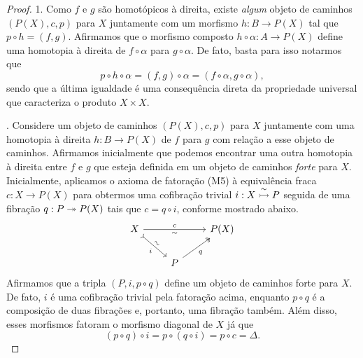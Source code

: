 \begin{proof}
  1. Como $f$ e $g$ são homotópicos à direita, existe \emph{algum} objeto de caminhos $(P(X),c,p)$ para $X$ juntamente com um morfismo $h: B \to P(X)$ tal que $p \circ h = (f,g)$.
  Afirmamos que o morfismo composto $h \circ \alpha: A \to P(X)$ define uma homotopia à direita de $f \circ \alpha$ para $g \circ \alpha$.
  De fato, basta para isso notarmos que
  \begin{displaymath}
    p \circ h \circ \alpha = (f,g) \circ \alpha = (f \circ \alpha, g \circ \alpha),
  \end{displaymath}
  sendo que a última igualdade é uma consequência direta da propriedade universal que caracteriza o produto $X \times X$.

  . Considere um objeto de caminhos $(P(X),c,p)$ para $X$ juntamente com uma homotopia à direita $h: B \to P(X)$ de $f$ para $g$ com relação a esse objeto de caminhos.
  Afirmamos inicialmente que podemos encontrar uma outra homotopia à direita entre $f$ e $g$ que esteja definida em um objeto de caminhos \emph{forte} para $X$.
  Inicialmente, aplicamos o axioma de fatoração (M5) à equivalência fraca $c: X \to P(X)$ para obtermos uma cofibração trivial $i: X \overset{\sim}{\rightarrowtail} P$ seguida de uma fibração $q: P \twoheadrightarrow P(X)$ tais que $c = q \circ i$, conforme mostrado abaixo.
  \begin{displaymath}
    \begin{tikzcd}
      X
      \arrow[rr, "c", "\sim" {swap}]
      \arrow[rd, tail, "i" {swap}, "\sim" {sloped}]
      & & P(X)
      \\ & P
      \arrow[ru, two heads, "q" swap]
    \end{tikzcd}
  \end{displaymath}
  Afirmamos que a tripla $(P,i,p \circ q)$ define um objeto de caminhos forte para $X$.
  De fato, $i$ é uma cofibração trivial pela fatoração acima, enquanto $p \circ q$ é a composição de duas fibrações e, portanto, uma fibração também.
  Além disso, esses morfismos fatoram o morfismo diagonal de $X$ já que
  \begin{displaymath}
    (p \circ q) \circ i = p \circ (q \circ i) = p \circ c = \Delta.
  \end{displaymath}


\end{proof}
